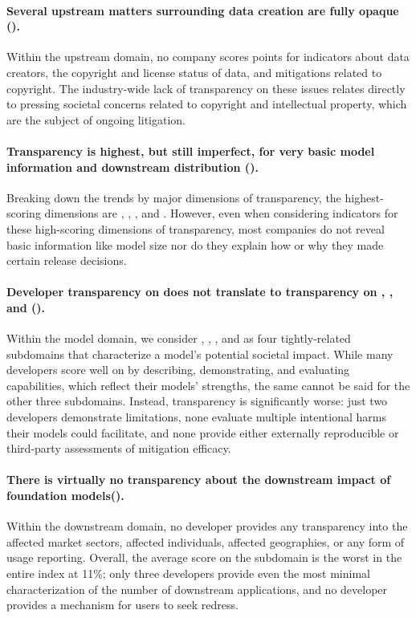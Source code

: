 \paragraph{Several upstream matters surrounding data creation are fully opaque ().}
Within the upstream domain, no company scores points for indicators about data creators, the copyright and license status of data, and mitigations related to copyright.
The industry-wide lack of transparency on these issues relates directly to pressing societal concerns related to copyright and intellectual property, which are the subject of ongoing litigation.

\paragraph{Transparency is highest, but still imperfect, for very basic model information and downstream distribution ().}
Breaking down the trends by major dimensions of transparency, the highest-scoring dimensions are \methods, \modelbasics, \capabilities, and \distribution.
However, even when considering indicators for these high-scoring dimensions of transparency, most companies do not reveal basic information like model size nor do they explain how or why they made certain release decisions. 

\paragraph{Developer transparency on \capabilities does not translate to transparency on \limitations, \risks, and \modelmitigations ().}
Within the model domain, we consider \capabilities, \limitations, \risks, and \modelmitigations as four tightly-related subdomains that characterize a model's potential societal impact.
While many developers score well on \capabilities by describing, demonstrating, and evaluating capabilities, which reflect their models' strengths, the same cannot be said for the other three subdomains.
Instead, transparency is significantly worse: just two developers demonstrate limitations, none evaluate multiple intentional harms their models could facilitate, and none provide either externally reproducible or third-party assessments of mitigation efficacy.

\paragraph{There is virtually no transparency about the downstream impact of foundation models().}
Within the downstream domain, no developer provides any transparency into the affected market sectors, affected individuals, affected geographies, or any form of usage reporting.
Overall, the average score on the \impact subdomain is the worst in the entire index at 11\%; only three developers provide even the most minimal characterization of the number of downstream applications, and no developer provides a mechanism for users to seek redress.

